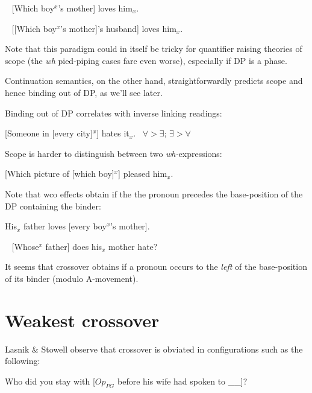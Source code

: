 \documentclass[nols,twoside,nofonts,nobib,nohyper]{tufte-handout}
\begin{document}
\ex~
{}[Which boy$^{x}$'s mother] loves him$_{x}$.
\xe

\ex~
{}[[Which boy$^{x}$'s mother]'s husband] loves him$_{x}$.
\xe

Note that this paradigm could in itself be tricky for quantifier raising theories of
scope (the \textit{wh} pied-piping cases fare even worse), especially if DP is
a phase.

Continuation semantics, on the other hand, straightforwardly predicts scope and
hence binding out of DP, as we'll see later.

Binding out of DP correlates with inverse linking readings:

\ex
{}[Someone in [every city]$^{x}$] hates it$_{x}$.\hfill
\cmark $\forall > \exists$; \xmark $\exists > \forall$
\xe

Scope is harder to distinguish between two \textit{wh-}expressions:

\ex
{}[Which picture of [which boy]$^{x}$] pleased him$_{x}$.
\xe

Note that \ac{wco} effects obtain if the the pronoun precedes the base-position
of the DP containing
the binder:

\ex
\ljudge{*}His$_{x}$ father loves [every boy$^{x}$'s mother].
\xe

\ex~
\ljudge{*}{}[Whose$^{x}$ father] does his$_{x}$ mother hate?
\xe

It seems that crossover obtains if a pronoun occurs to the \textit{left} of the
base-position of its binder (modulo A-movement).

\section{Weakest crossover}

Lasnik \& Stowell observe that crossover is obviated in configurations such as
the following:

\ex
Who did you stay with [$Op_{PG}$ before his wife had spoken to \_\_]?
\xe
\end{document}
